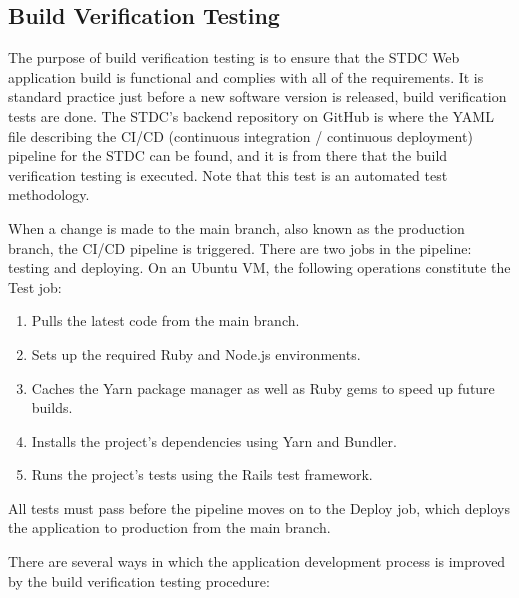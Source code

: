 
\vspace{0.25cm}
\subsection{Build Verification Testing}
\begin{justify}
The purpose of build verification testing is to ensure that the STDC Web application build is functional and complies with all of the requirements. It is standard practice just before a new software version is released, build verification tests are done. The STDC's backend repository on GitHub is where the YAML file describing the CI/CD (continuous integration / continuous deployment) pipeline for the STDC can be found, and it is from there that the build verification testing is executed. Note that this test is an automated test methodology.

\vspace{0.25cm}
\newendline When a change is made to the main branch, also known as the production branch, the CI/CD pipeline is triggered. There are two jobs in the pipeline: testing and deploying. On an Ubuntu VM, the following operations constitute the Test job:

\begin{enumerate}
    \item Pulls the latest code from the main branch.
    \item Sets up the required Ruby and Node.js environments.
    \item Caches the Yarn package manager as well as Ruby gems to speed up future builds.
    \item Installs the project's dependencies using Yarn and Bundler.
    \item Runs the project's tests using the Rails test framework.
\end{enumerate}

\vspace{0.25cm}
\newendline All tests must pass before the pipeline moves on to the Deploy job, which deploys the application to production from the main branch.

\vspace{0.25cm}
\newendline There are several ways in which the application development process is improved by the build verification testing procedure:


\end{justify}
